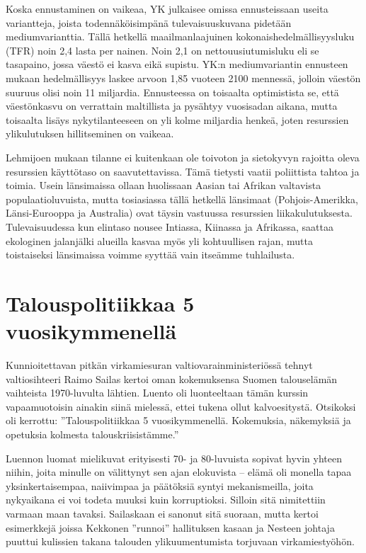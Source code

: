 \documentclass[12pt]{article}
\begin{document}
Koska ennustaminen on vaikeaa, YK julkaisee omissa ennusteissaan useita variantteja, joista todennäköisimpänä tulevaisuuskuvana pidetään mediumvarianttia. Tällä hetkellä maailmanlaajuinen kokonaishedelmällisyysluku (TFR) noin 2,4 lasta per nainen. Noin 2,1 on nettouusiutumisluku eli se tasapaino, jossa väestö ei kasva eikä supistu. YK:n mediumvariantin ennusteen mukaan hedelmällisyys laskee arvoon 1,85 vuoteen 2100 mennessä, jolloin väestön suuruus olisi noin 11 miljardia. Ennusteessa on toisaalta optimistista se, että väestönkasvu on verrattain maltillista ja pysähtyy vuosisadan aikana, mutta toisaalta lisäys nykytilanteeseen on yli kolme miljardia henkeä, joten resurssien ylikulutuksen hillitseminen on vaikeaa.

Lehmijoen mukaan tilanne ei kuitenkaan ole toivoton ja sietokyvyn rajoitta oleva resurssien käyttötaso on saavutettavissa. Tämä tietysti vaatii poliittista tahtoa ja toimia. Usein länsimaissa ollaan huolissaan Aasian tai Afrikan valtavista populaatioluvuista, mutta tosiasiassa tällä hetkellä länsimaat (Pohjois-Amerikka, Länsi-Eurooppa ja Australia) ovat täysin vastuussa resurssien liikakulutuksesta. Tulevaisuudessa kun elintaso nousee Intiassa, Kiinassa ja Afrikassa, saattaa ekologinen jalanjälki alueilla kasvaa myös yli kohtuullisen rajan, mutta toistaiseksi länsimaissa voimme syyttää vain itseämme tuhlailusta.


\newpage
\section{Talouspolitiikkaa 5 vuosikymmenellä}

Kunnioitettavan pitkän virkamiesuran valtiovarainministeriössä tehnyt valtiosihteeri Raimo Sailas kertoi oman kokemuksensa Suomen talouselämän vaihteista 1970-luvulta lähtien. Luento oli luonteeltaan tämän kurssin vapaamuotoisin ainakin siinä mielessä, ettei tukena ollut kalvoesitystä. Otsikoksi oli kerrottu: ''Talouspolitiikkaa 5 vuosikymmenellä. Kokemuksia, näkemyksiä ja opetuksia kolmesta talouskriisistämme.''

Luennon luomat mielikuvat erityisesti 70- ja 80-luvuista sopivat hyvin yhteen niihin, joita minulle on välittynyt sen ajan elokuvista -- elämä oli monella tapaa yksinkertaisempaa, naiivimpaa ja päätöksiä syntyi mekanismeilla, joita nykyaikana ei voi todeta muuksi kuin korruptioksi. Silloin sitä nimitettiin varmaan maan tavaksi. Sailaskaan ei sanonut sitä suoraan, mutta kertoi esimerkkejä joissa Kekkonen ''runnoi'' hallituksen kasaan ja Nesteen johtaja puuttui kulissien takana talouden ylikuumentumista torjuvaan virkamiestyöhön.
\end{document}
